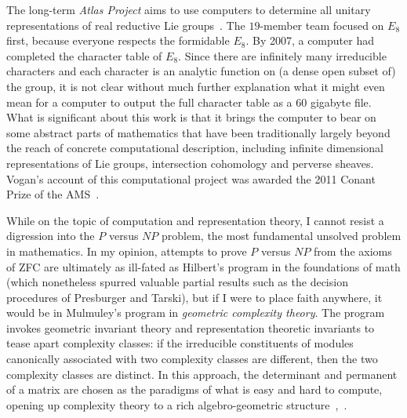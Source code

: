 \documentclass{llncs}
\begin{document}
The long-term {\it Atlas Project} aims to use computers to determine
all unitary representations of real reductive Lie groups~\cite{Atlas}.
The $19$-member team   focused on $E_8$
first, because everyone respects the formidable $E_8$.  By 2007, a
computer had completed the character table of $E_8$.  Since there are
infinitely many irreducible characters and each character is an
analytic function on (a dense open subset of) the group, it is not
clear without much further explanation what it might even mean for a
computer to output the full character table as a $60$ gigabyte file.  What
is significant about this work is that it brings the computer to bear
on some abstract parts of mathematics that have been traditionally
largely beyond the reach of concrete computational description,
including infinite dimensional representations of Lie groups,
intersection cohomology and perverse sheaves.  Vogan's account of this
computational project was awarded the 2011 Conant Prize of the
AMS~\cite{VE8}.






While on the topic of computation and representation theory, I cannot
resist a digression into the $P$ versus $NP$ problem, the most
fundamental unsolved problem in mathematics. In my opinion, attempts
to prove $P$ versus $NP$ from the axioms of ZFC are ultimately as
ill-fated as Hilbert's program in the foundations of math (which
nonetheless spurred valuable partial results such as the decision
procedures of Presburger and Tarski), but if I were to place faith
anywhere, it would be in Mulmuley's program in {\it geometric
  complexity theory}.  The program invokes geometric invariant theory
and representation theoretic invariants to tease apart complexity
classes: if the irreducible constituents of modules canonically
associated with two complexity classes are different, then the two
complexity classes are distinct.  In this approach, the determinant
and permanent of a matrix are chosen as the paradigms of what is easy
and hard to compute, opening up complexity theory to a rich
algebro-geometric structure~\cite{Mul11},~\cite{FPNP}.
\end{document}
